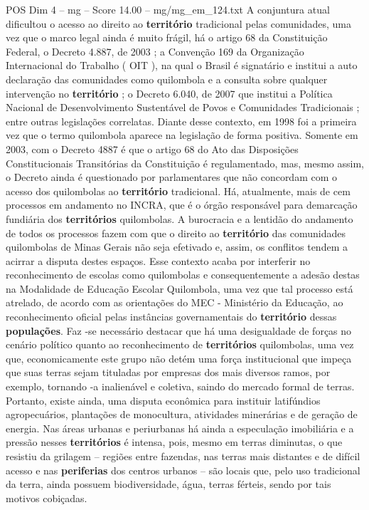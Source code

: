\begin{textsample}{POS Dim 4 – mg – Score 14.00 – mg/mg\_em\_124.txt}
A conjuntura atual dificultou o acesso ao direito ao \textbf{território} tradicional pelas comunidades, uma vez que o marco legal ainda é muito frágil, há o artigo 68 da Constituição Federal, o Decreto 4.887, de 2003 ; a Convenção 169 da Organização Internacional do Trabalho ( OIT ), na qual o Brasil é signatário e institui a auto declaração das comunidades como quilombola e a consulta sobre qualquer intervenção no \textbf{território} ; o Decreto 6.040, de 2007 que institui a Política Nacional de Desenvolvimento Sustentável de Povos e Comunidades Tradicionais ; entre outras legislações correlatas.
Diante desse contexto, em 1998 foi a primeira vez que o termo quilombola aparece na legislação de forma positiva.
Somente em 2003, com o Decreto 4887 é que o artigo 68 do Ato das Disposições Constitucionais Transitórias da Constituição é regulamentado, mas, mesmo assim, o Decreto ainda é questionado por parlamentares que não concordam com o acesso dos quilombolas ao \textbf{território} tradicional.
Há, atualmente, mais de cem processos em andamento no INCRA, que é o órgão responsável para demarcação fundiária dos \textbf{territórios} quilombolas.
A burocracia e a lentidão do andamento de todos os processos fazem com que o direito ao \textbf{território} das comunidades quilombolas de Minas Gerais não seja efetivado e, assim, os conflitos tendem a acirrar a disputa destes espaços.
Esse contexto acaba por interferir no reconhecimento de escolas como quilombolas e consequentemente a adesão destas na Modalidade de Educação Escolar Quilombola, uma vez que tal processo está atrelado, de acordo com as orientações do MEC - Ministério da Educação, ao reconhecimento oficial pelas instâncias governamentais do \textbf{território} dessas \textbf{populações}.
Faz -se necessário destacar que há uma desigualdade de forças no cenário político quanto ao reconhecimento de \textbf{territórios} quilombolas, uma vez que, economicamente este grupo não detém uma força institucional que impeça que suas terras sejam tituladas por empresas dos mais diversos ramos, por exemplo, tornando -a inalienável e coletiva, saindo do mercado formal de terras.
Portanto, existe ainda, uma disputa econômica para instituir latifúndios agropecuários, plantações de monocultura, atividades minerárias e de geração de energia.
Nas áreas urbanas e periurbanas há ainda a especulação imobiliária e a pressão nesses \textbf{territórios} é intensa, pois, mesmo em terras diminutas, o que resistiu da grilagem – regiões entre fazendas, nas terras mais distantes e de difícil acesso e nas \textbf{periferias} dos centros urbanos – são locais que, pelo uso tradicional da terra, ainda possuem biodiversidade, água, terras férteis, sendo por tais motivos cobiçadas.

\end{textsample}
